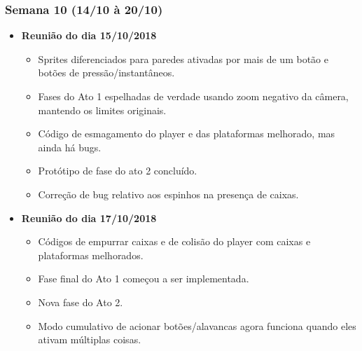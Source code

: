 \documentclass[a4paper, 11pt]{article}
\begin{document}
\subsubsection{Semana 10 (14/10 à 20/10)}
	\begin{itemize} 
		\item \textbf{Reunião do dia 15/10/2018}

		\begin{itemize}

   			\item Sprites diferenciados para paredes ativadas por mais de um botão e botões de pressão/instantâneos.
    		\item Fases do Ato 1 espelhadas de verdade usando zoom negativo da câmera, mantendo os limites originais.
    		\item Código de esmagamento do player e das plataformas melhorado, mas ainda há bugs.
    		\item Protótipo de fase do ato 2 concluído.
    		\item Correção de bug relativo aos espinhos na presença de caixas.

   		\end{itemize}

		\item \textbf{Reunião do dia 17/10/2018}

		\begin{itemize}

    		\item Códigos de empurrar caixas e de colisão do player com caixas e plataformas melhorados.
    		\item Fase final do Ato 1 começou a ser implementada.
    		\item Nova fase do Ato 2.
    		\item Modo cumulativo de acionar botões/alavancas agora funciona quando eles ativam múltiplas coisas.

		\end{itemize}

	\end{itemize}
\end{document}
